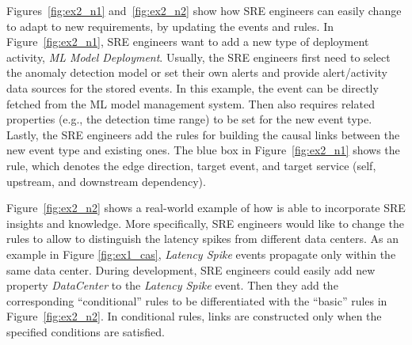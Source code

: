 Figures~\ref{fig:ex2_n1} and~\ref{fig:ex2_n2} show how SRE engineers can easily change \system to adapt to new requirements, by updating the events and rules. In Figure~\ref{fig:ex2_n1}, SRE engineers want to add a new type of deployment activity, \emph{ML Model Deployment}. Usually, the SRE engineers first need to select the anomaly detection model or set their own alerts and provide alert/activity data sources for the stored events. In this example, the event can be directly fetched from the ML model management system. Then \system also requires related properties (e.g., the detection time range) to be set for the new event type. Lastly, the SRE engineers add the rules for building the causal links between the new event type and existing ones. The blue box in Figure~\ref{fig:ex2_n1} shows the rule, which denotes the edge direction, target event, and target service (self, upstream, and downstream dependency). 

Figure~\ref{fig:ex2_n2} shows a real-world example of how \system is able to incorporate SRE insights and knowledge. More specifically, SRE engineers would like to change the rules to allow \system to distinguish the latency spikes from different data centers. As an example in Figure \ref{fig:ex1_cas}, \emph{Latency Spike} events propagate only within the same data center. During \system development, SRE engineers could easily add new property \emph{DataCenter} to the \emph{Latency Spike} event. Then they add the corresponding ``conditional'' rules to be differentiated with the ``basic'' rules in Figure~\ref{fig:ex2_n2}. In conditional rules, links are constructed only when the specified conditions are satisfied. %